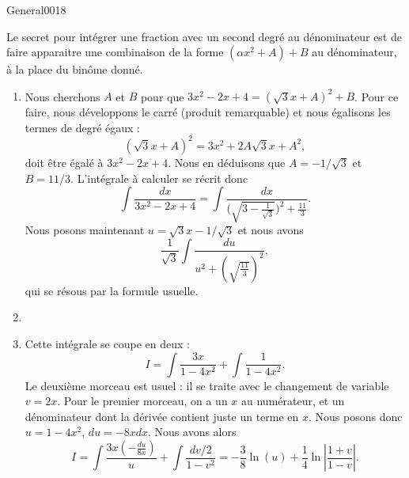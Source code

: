 \begin{corrige}{General0018}

Le secret pour intégrer une fraction avec un second degré au dénominateur est de faire apparaitre une combinaison de la forme $(\alpha x^2+A)+B$ au dénominateur, à la place du binôme donné.

\begin{enumerate}

\item
 Nous cherchons $A$ et $B$ pour que $3x^2-2x+4=(\sqrt{3}x+A)^2+B$. Pour ce faire, nous développons le carré (produit remarquable) et nous égalisons les termes de degré égaux :
\begin{equation}
	(\sqrt{3}x+A)^2=3x^2+2A\sqrt{3}x+A^2,
\end{equation}
doit être égalé à $3x^2-2x+4$. Nous en déduisons que $A=-1/\sqrt{3}$ et $B=11/3$. L'intégrale à calculer se récrit donc
\begin{equation}
	\int\frac{ dx }{ 3x^2-2x+4 }=\int\frac{ dx }{ \big( \sqrt{3-\frac{1}{ \sqrt{3} }} \big)^2+\frac{ 11 }{ 3 } }.
\end{equation}
Nous posons maintenant $u=\sqrt{3}x-1/\sqrt{3}$ et nous avons
\begin{equation}
	\frac{1}{ \sqrt{3} }\int\frac{ du }{ u^2+ \left( \sqrt{\frac{ 11 }{ 3 }} \right)^2  },
\end{equation}
qui se résous par la formule usuelle.

\item
\item
Cette intégrale se coupe en deux :
\begin{equation}
	I=\int\frac{ 3x }{ 1-4x^2 }+\int\frac{ 1 }{ 1-4x^2 }.
\end{equation}
Le deuxième morceau est usuel : il se traite avec le changement de variable $v=2x$. Pour le premier morceau, on a un $x$ au numérateur, et un dénominateur dont la dérivée contient juste un terme en $x$. Nous posons donc $u=1-4x^2$, $du=-8xdx$. Nous avons alors
\begin{equation}
	I=\int\frac{ 3x\left( -\frac{ du }{ 8x } \right) }{ u }+\int\frac{ dv/2 }{ 1-v^2 }=-\frac{ 3 }{ 8 }\ln(u)+\frac{1}{ 4 }\ln\left| \frac{ 1+v }{ 1-v } \right| .
\end{equation}


\end{enumerate}
\end{corrige}
